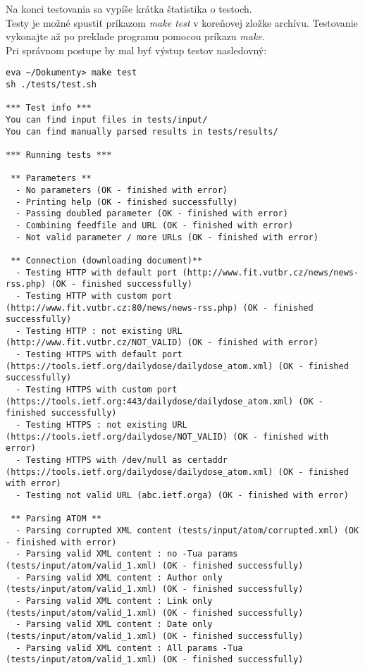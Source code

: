 \documentclass[11pt,a4paper]{article}
\begin{document}
Na konci testovania sa vypíše krátka štatistika o testoch.\\

\noindent Testy je možné spustiť príkazom \textit{make test} v koreňovej zložke archívu. Testovanie vykonajte až po preklade programu pomocou príkazu \textit{make}.\\

\noindent Pri správnom postupe by mal byť výstup testov nasledovný:
{\tiny
\begin{verbatim}
eva ~/Dokumenty> make test
sh ./tests/test.sh

*** Test info ***
You can find input files in tests/input/
You can find manually parsed results in tests/results/

*** Running tests ***

 ** Parameters **
  - No parameters (OK - finished with error)
  - Printing help (OK - finished successfully) 
  - Passing doubled parameter (OK - finished with error)
  - Combining feedfile and URL (OK - finished with error)
  - Not valid parameter / more URLs (OK - finished with error)

 ** Connection (downloading document)**
  - Testing HTTP with default port (http://www.fit.vutbr.cz/news/news-rss.php) (OK - finished successfully) 
  - Testing HTTP with custom port (http://www.fit.vutbr.cz:80/news/news-rss.php) (OK - finished successfully) 
  - Testing HTTP : not existing URL (http://www.fit.vutbr.cz/NOT_VALID) (OK - finished with error)
  - Testing HTTPS with default port (https://tools.ietf.org/dailydose/dailydose_atom.xml) (OK - finished successfully) 
  - Testing HTTPS with custom port (https://tools.ietf.org:443/dailydose/dailydose_atom.xml) (OK - finished successfully) 
  - Testing HTTPS : not existing URL (https://tools.ietf.org/dailydose/NOT_VALID) (OK - finished with error)
  - Testing HTTPS with /dev/null as certaddr (https://tools.ietf.org/dailydose/dailydose_atom.xml) (OK - finished with error)
  - Testing not valid URL (abc.ietf.orga) (OK - finished with error)

 ** Parsing ATOM ** 
  - Parsing corrupted XML content (tests/input/atom/corrupted.xml) (OK - finished with error)
  - Parsing valid XML content : no -Tua params (tests/input/atom/valid_1.xml) (OK - finished successfully) 
  - Parsing valid XML content : Author only (tests/input/atom/valid_1.xml) (OK - finished successfully) 
  - Parsing valid XML content : Link only (tests/input/atom/valid_1.xml) (OK - finished successfully) 
  - Parsing valid XML content : Date only (tests/input/atom/valid_1.xml) (OK - finished successfully) 
  - Parsing valid XML content : All params -Tua (tests/input/atom/valid_1.xml) (OK - finished successfully) 


\end{verbatim}}
\end{document}

